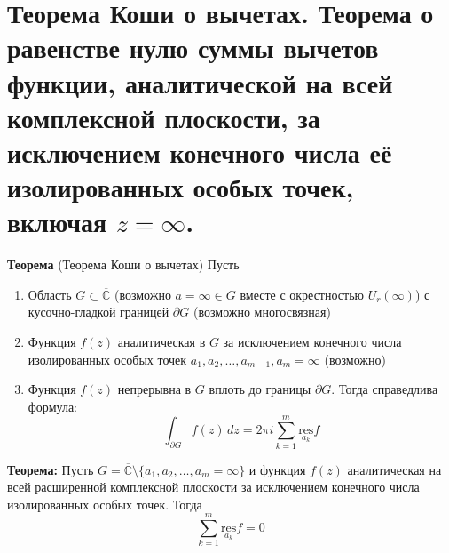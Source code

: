\section{\texorpdfstring{Теорема Коши о вычетах. Теорема о равенстве
нулю суммы вычетов функции, аналитической на всей комплексной плоскости,
за исключением конечного числа её изолированных особых точек, включая
\(z=\infty\).}{Теорема Коши о вычетах. Теорема о равенстве нулю суммы вычетов функции, аналитической на всей комплексной плоскости, за исключением конечного числа её изолированных особых точек, включая z=\textbackslash infty.}}\label{ux442ux435ux43eux440ux435ux43cux430-ux43aux43eux448ux438-ux43e-ux432ux44bux447ux435ux442ux430ux445.-ux442ux435ux43eux440ux435ux43cux430-ux43e-ux440ux430ux432ux435ux43dux441ux442ux432ux435-ux43dux443ux43bux44e-ux441ux443ux43cux43cux44b-ux432ux44bux447ux435ux442ux43eux432-ux444ux443ux43dux43aux446ux438ux438-ux430ux43dux430ux43bux438ux442ux438ux447ux435ux441ux43aux43eux439-ux43dux430-ux432ux441ux435ux439-ux43aux43eux43cux43fux43bux435ux43aux441ux43dux43eux439-ux43fux43bux43eux441ux43aux43eux441ux442ux438-ux437ux430-ux438ux441ux43aux43bux44eux447ux435ux43dux438ux435ux43c-ux43aux43eux43dux435ux447ux43dux43eux433ux43e-ux447ux438ux441ux43bux430-ux435ux451-ux438ux437ux43eux43bux438ux440ux43eux432ux430ux43dux43dux44bux445-ux43eux441ux43eux431ux44bux445-ux442ux43eux447ux435ux43a-ux432ux43aux43bux44eux447ux430ux44f-zinfty.}

\textbf{Теорема} (Теорема Коши о вычетах) Пусть

\begin{enumerate}
\def\labelenumi{\arabic{enumi}.}
\tightlist
\item
  Область \(G\subset \overline{\mathbb{C}}\) (возможно
  \(a=\infty \in G\) вместе с окрестностью \(U_{r}(\infty)\)) с
  кусочно-гладкой границей \(\partial G\) (возможно многосвязная)
\item
  Функция \(f(z)\) аналитическая в \(G\) за исключением конечного числа
  изолированных особых точек \(a_{1},a_{2},\dots,a_{m-1},a_{m}=\infty\)
  (возможно)
\item
  Функция \(f(z)\) непрерывна в \(G\) вплоть до границы \(\partial G\).
  Тогда справедлива формула: \[
  \int_{\partial G}f(z)\,dz=2\pi i \sum_{k=1}^{m}\underset{a_{k}}{\mathrm{res}} f
  \]
\end{enumerate}

\textbf{Теорема:} Пусть
\(G=\overline{\mathbb{C}}\setminus \{ a_{1},a_{2},\dots,a_{m}=\infty \}\)
и функция \(f(z)\) аналитическая на всей расширенной комплексной
плоскости за исключением конечного числа изолированных особых точек.
Тогда \[
\sum_{k=1}^{m}\underset{a_{k}}{\mathrm{res}} f=0
\]
